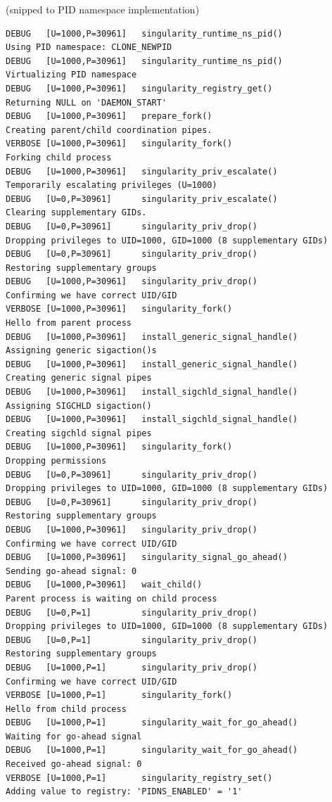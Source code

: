 \documentclass[a4paper]{article}
\begin{document}
(snipped to PID namespace implementation)

\begin{lstlisting}[frame=single]
DEBUG   [U=1000,P=30961]   singularity_runtime_ns_pid()              Using PID namespace: CLONE_NEWPID
DEBUG   [U=1000,P=30961]   singularity_runtime_ns_pid()              Virtualizing PID namespace
DEBUG   [U=1000,P=30961]   singularity_registry_get()                Returning NULL on 'DAEMON_START'
DEBUG   [U=1000,P=30961]   prepare_fork()                            Creating parent/child coordination pipes.
VERBOSE [U=1000,P=30961]   singularity_fork()                        Forking child process
DEBUG   [U=1000,P=30961]   singularity_priv_escalate()               Temporarily escalating privileges (U=1000)
DEBUG   [U=0,P=30961]      singularity_priv_escalate()               Clearing supplementary GIDs.
DEBUG   [U=0,P=30961]      singularity_priv_drop()                   Dropping privileges to UID=1000, GID=1000 (8 supplementary GIDs)
DEBUG   [U=0,P=30961]      singularity_priv_drop()                   Restoring supplementary groups
DEBUG   [U=1000,P=30961]   singularity_priv_drop()                   Confirming we have correct UID/GID
VERBOSE [U=1000,P=30961]   singularity_fork()                        Hello from parent process
DEBUG   [U=1000,P=30961]   install_generic_signal_handle()           Assigning generic sigaction()s
DEBUG   [U=1000,P=30961]   install_generic_signal_handle()           Creating generic signal pipes
DEBUG   [U=1000,P=30961]   install_sigchld_signal_handle()           Assigning SIGCHLD sigaction()
DEBUG   [U=1000,P=30961]   install_sigchld_signal_handle()           Creating sigchld signal pipes
DEBUG   [U=1000,P=30961]   singularity_fork()                        Dropping permissions
DEBUG   [U=0,P=30961]      singularity_priv_drop()                   Dropping privileges to UID=1000, GID=1000 (8 supplementary GIDs)
DEBUG   [U=0,P=30961]      singularity_priv_drop()                   Restoring supplementary groups
DEBUG   [U=1000,P=30961]   singularity_priv_drop()                   Confirming we have correct UID/GID
DEBUG   [U=1000,P=30961]   singularity_signal_go_ahead()             Sending go-ahead signal: 0
DEBUG   [U=1000,P=30961]   wait_child()                              Parent process is waiting on child process
DEBUG   [U=0,P=1]          singularity_priv_drop()                   Dropping privileges to UID=1000, GID=1000 (8 supplementary GIDs)
DEBUG   [U=0,P=1]          singularity_priv_drop()                   Restoring supplementary groups
DEBUG   [U=1000,P=1]       singularity_priv_drop()                   Confirming we have correct UID/GID
VERBOSE [U=1000,P=1]       singularity_fork()                        Hello from child process
DEBUG   [U=1000,P=1]       singularity_wait_for_go_ahead()           Waiting for go-ahead signal
DEBUG   [U=1000,P=1]       singularity_wait_for_go_ahead()           Received go-ahead signal: 0
VERBOSE [U=1000,P=1]       singularity_registry_set()                Adding value to registry: 'PIDNS_ENABLED' = '1'
\end{lstlisting}
\end{document}
